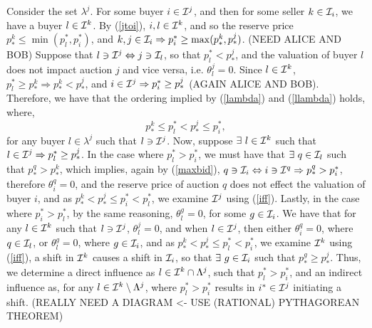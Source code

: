 {Consider the set $\lambda^j$. For some buyer $i\in\mathcal{I}^j$, and then for
some seller $k \in \mathcal{I}_i$, we have a buyer $l \in \mathcal{I}^k$. By (\ref{jtoi}), $i,l \in \mathcal{I}^k$, and so the reserve price $p_*^k \le \min(p_l^*, p_i^*)$, and $k, j\in \mathcal{I}_i\Rightarrow p_i^* \ge \max(p_*^k, p_*^j)$. (NEED ALICE AND BOB) Suppose that $l \ni \mathcal{I}^j\Leftrightarrow j \ni \mathcal{I}_l$, so that $p_l^* < p_*^j$, and
the valuation of buyer $l$ does not impact auction $j$ and vice versa, i.e. $\theta_l^j = 0$. Since $l\in\mathcal{I}^k$, $p_l^* \ge p_*^k\Rightarrow
p_*^k < p_*^j$, and $i\in\mathcal{I}^j \Rightarrow p_i^* \ge p_*^j$ (AGAIN ALICE AND BOB). Therefore, we
have that the ordering implied by (\ref{lambda}) and (\ref{llambda}) holds,
where,
\begin{equation}\label{ordering}
    p_*^k \le p_l^* < p_*^j \le p_i^*,
\end{equation} 
for any buyer $l\in\lambda^j$ such that $l\ni \mathcal{I}^j$. Now, suppose $\exists \ l\in\mathcal{I}^k$ such that $l\in\mathcal{I}^j \Rightarrow p_l^* \ge
p_*^j$. In the case where $p_l^* > p_i^*$, we must have that 
$\exists \ q \in \mathcal{I}_l$ such that $p_*^q > p_*^k$, %
which implies, again by (\ref{maxbid}), $q\ni\mathcal{I}_i \Leftrightarrow i
\ni\mathcal{I}^q \Rightarrow p_*^q >
p_i^*$, therefore $\theta_i^q = 0$, and the reserve price of auction $q$ does not effect the valuation of buyer $i$, and as $p_*^k < p_*^j \le p_i^* < p_l^*$, we examine $\mathcal{I}^j$ using (\ref{iff}).
Lastly, in the case where $p_i^* > p_l^*$, by the same reasoning, $\theta_l^g =
0$, for some $g\in\mathcal{I}_i$.
We have that for any $l\in\mathcal{I}^k$ such that $l\ni \mathcal{I}^j$, $\theta_l^j =0$, and when $l\in \mathcal{I}^j$, then either $\theta_i^q =0$,
where $q\in\mathcal{I}_l$, or $\theta_l^g = 0$, where $g\in\mathcal{I}_i$, and as $p_*^k <
p_*^j \le p_l^* < p_i^*$, we examine $\mathcal{I}^k$ using (\ref{iff}),
a shift in $\mathcal{I}^k$ causes a shift in $\mathcal{I}_i$, so that $\exists \ g\in\mathcal{I}_i$
such that $p_*^g \ge p_*^j$. Thus, we
determine a direct influence as $l\in\mathcal{I}^k
\cap \Lambda^j$, such that $p_l^* > p_i^*$,
and an indirect influence as, for any $l\in\mathcal{I}^k \setminus \Lambda^j$, where $p_l^* > p_i^*$ results in $i^*\in\mathcal{I}^j$ initiating a shift. (REALLY NEED A DIAGRAM <- USE (RATIONAL) PYTHAGOREAN THEOREM)

}
